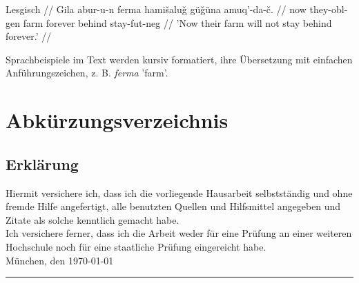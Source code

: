 \documentclass[12pt,letterpaper]{article} %
\begin{document}
\begingl
\glpreamble  Lesgisch \citep[207]{haspelmath1993grammar} //
\gla Gila abur-u-n ferma hamišaluǧ güǧüna amuq’-da-č. //
\glb now they-{\sc obl}-{\sc gen} farm forever behind stay-{\sc fut}-{\sc neg} //
\glft 'Now their farm will not stay behind forever.' //
\endgl
\xe


Sprachbeispiele im Text werden kursiv formatiert, ihre Übersetzung mit einfachen Anführungszeichen, z. B. \emph{ferma} 'farm'.



\pagebreak

\pagestyle{fancy}


\nocite{*} %

\clearpage
\section*{Abkürzungsverzeichnis}
\begin{multicols}{2}
\begin{acronym}[abr]
\end{acronym}
\end{multicols}


\pagebreak
\subsection*{Erklärung}
\label{erklaerung}
\vspace*{0.5cm}
Hiermit versichere ich, dass ich die vorliegende Hausarbeit selbstständig und \mbox{ohne} fremde Hilfe angefertigt, alle benutzten Quellen und Hilfsmittel angegeben und \mbox{Zitate} als solche kenntlich gemacht habe.\\[0.5cm]
Ich versichere ferner, dass ich die Arbeit weder für eine Prüfung an einer weiteren Hochschule noch für eine staatliche Prüfung eingereicht habe. \\[1.0cm]
München, den \today \\[2.0cm]
\rule{6.0cm}{0.4pt} \\

\pagebreak
\end{document}
